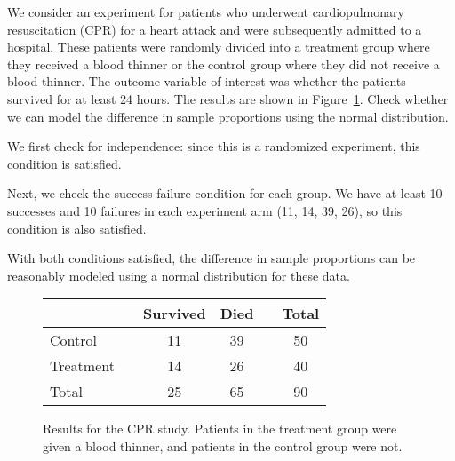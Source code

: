 \begin{examplewrap}
\begin{nexample}{We consider an experiment for patients
    who underwent cardiopulmonary resuscitation (CPR)
    for a heart attack and were
    subsequently admitted to a
    hospital.
    These patients were randomly divided into a treatment
    group where they received a blood thinner or the control
    group where they did not receive a blood thinner.
    The outcome variable of interest was whether the
    patients survived for at least 24 hours.
    The results are shown in
    Figure~\ref{resultsForCPRStudyInSmallSampleSection}.
    Check whether we can model the difference in
    sample proportions using the normal distribution.}

  We first check for independence:
  since this is a randomized experiment,
  this condition is satisfied.
  
  Next, we check the success-failure condition for
  each group.
  We have at least 10 successes and 10 failures in
  each experiment arm (11, 14, 39, 26),
  so this condition is also satisfied.

  With both conditions satisfied,
  the difference in sample proportions can be
  reasonably modeled using a normal distribution
  for these data.
\end{nexample}
\end{examplewrap}

\begin{figure}[ht]
\centering
\begin{tabular}{lccccc}
\hline
			&& Survived 	& Died 	&& Total \\
\hline
Control		&& 11		& 39		&& 50 \\
Treatment		&& 14		& 26		&& 40 \\
\hline
Total			&& 25		& 65		&& 90 \\
\hline
\end{tabular}
\caption{Results for the CPR study.
    Patients in the treatment group were given
    a blood thinner, and patients in the control
    group were not.}
\label{resultsForCPRStudyInSmallSampleSection}
\end{figure}

